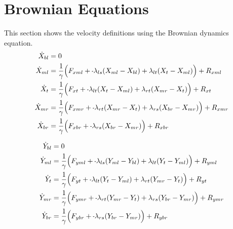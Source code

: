 \documentclass[11pt, landscape]{article}
\newcommand{\mn}{\scalebox{0.7}[1.0]{-}}
\begin{document}
\section{Brownian Equations}
This section shows the velocity definitions using the Brownian dynamics equation. \\
\begin{align}  
  \dot{X}_{bl} &= 0 \\
  \dot{X}_{ml} &= \frac{1}{\gamma} \Big(F_{xml} + \mn \lambda_{ls}(X_{ml} - X_{bl}) + \lambda_{lt}(X_{t } - X_{ml}) \Big) + R_{xml} \\
  \dot{X}_{t } &= \frac{1}{\gamma} \Big(F_{xt } + \mn \lambda_{lt}(X_{t } - X_{ml}) + \lambda_{rt}(X_{mr} - X_{t }) \Big) + R_{xt } \\
  \dot{X}_{mr} &= \frac{1}{\gamma} \Big(F_{xmr} + \mn \lambda_{rt}(X_{mr} - X_{t }) + \lambda_{rs}(X_{br} - X_{mr}) \Big) + R_{xmr} \\
  \dot{X}_{br} &= \frac{1}{\gamma} \Big(F_{xbr} + \mn \lambda_{rs}(X_{br} - X_{mr})                                 \Big) + R_{xbr}
\end{align}

\begin{align}  
  \dot{Y}_{bl} &= 0 \\
  \dot{Y}_{ml} &= \frac{1}{\gamma} \Big(F_{yml} + \mn \lambda_{ls}(Y_{ml} - Y_{bl}) + \lambda_{lt}(Y_{t } - Y_{ml}) \Big) + R_{yml} \\
  \dot{Y}_{t}  &= \frac{1}{\gamma} \Big(F_{yt } + \mn \lambda_{lt}(Y_{t } - Y_{ml}) + \lambda_{rt}(Y_{mr} - Y_{t }) \Big) + R_{yt } \\
  \dot{Y}_{mr} &= \frac{1}{\gamma} \Big(F_{ymr} + \mn \lambda_{rt}(Y_{mr} - Y_{t }) + \lambda_{rs}(Y_{br} - Y_{mr}) \Big) + R_{ymr} \\
  \dot{Y}_{br} &= \frac{1}{\gamma} \Big(F_{ybr} + \mn \lambda_{rs}(Y_{br} - Y_{mr})                                 \Big) + R_{ybr}
\end{align}
\end{document}
